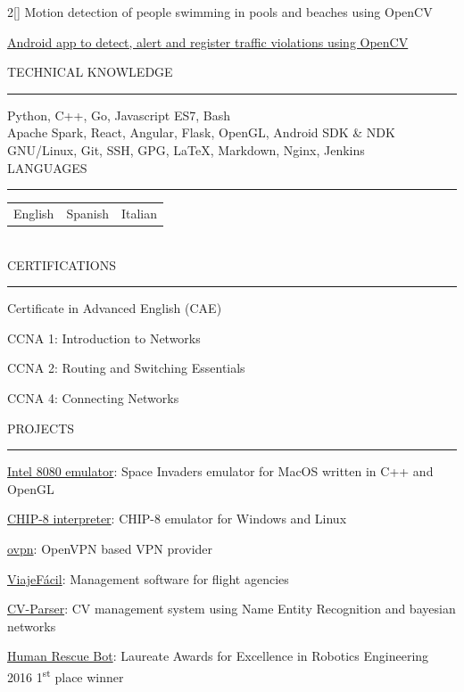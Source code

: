\documentclass[a4paper, 12pt]{article}
\newenvironment{myparacol}[2][]{%
\begin{paracol}{#2}[#1]\setlength{\parindent}{0pt}}{%
\end{paracol}}
\begin{document}
\begin{sloppypar}
\begin{myparacol}{2}
    Motion detection of people swimming in pools and beaches using OpenCV

    \href{https://github.com/hugo19941994/infrac-coche}{Android app to detect, alert and register traffic violations using OpenCV}
    \\

    \switchcolumn{}

    TECHNICAL KNOWLEDGE
    \vspace{1mm}
    \hrule
    \kern9pt

    Python, C++, Go, Javascript ES7, Bash\\

    Apache Spark, React, Angular, Flask, OpenGL, Android SDK \& NDK\\

    GNU/Linux, Git, SSH, GPG, \LaTeX, Markdown, Nginx, Jenkins\\

    LANGUAGES
    \vspace{1mm}
    \hrule
    \kern9pt
    \noindent\begin{tabularx}{\columnwidth}{@{} X X X}
        English & Spanish & Italian
    \end{tabularx}
    \\

    CERTIFICATIONS
    \vspace{1mm}
    \hrule
    \kern9pt
    Certificate in Advanced English (CAE)

    CCNA 1: Introduction to Networks

    CCNA 2: Routing and Switching Essentials

    CCNA 4: Connecting Networks

    \switchcolumn{}

    \noindent PROJECTS
    \vspace{1mm}
    \hrule
    \kern9pt
    \href{https://github.com/hugo19941994/SpaceInvaders-Emu}{Intel 8080 emulator}: Space Invaders emulator for MacOS written in C++ and OpenGL

    \href{https://github.com/hugo19941994/CHIP8-Emu}{CHIP-8 interpreter}: CHIP-8 emulator for Windows and Linux

    \href{https://vpn.hugofs.com}{ovpn}: OpenVPN based VPN provider

    \href{https://github.com/hugo19941994/ViajeFacil}{ViajeFácil}: Management software for flight agencies

    \href{https://github.com/hugo19941994/CV-Parser}{CV-Parser}: CV management system using Name Entity Recognition and bayesian networks

    \href{https://github.com/hugo19941994/robot}{Human Rescue Bot}: Laureate Awards for Excellence in Robotics Engineering 2016 1\textsuperscript{st} place winner

\end{myparacol}
\end{sloppypar}
\end{document}
